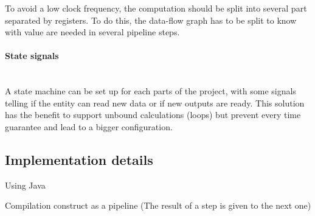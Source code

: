 \documentclass[10pt,a4paper]{article}
\begin{document}
To avoid a low clock frequency, the computation should be split into several part separated by registers. To do this, the data-flow graph has to be split to know with value are needed in several pipeline steps.


\paragraph{State signals}
~\\
A state machine can be set up for each parts of the project, with some signals telling if the entity can read new data or if new outputs are ready. This solution has the benefit to support unbound calculations (loops) but prevent every time guarantee and lead to a bigger configuration.



\subsection{Implementation details}

Using Java

Compilation construct as a pipeline (The result of a step is given to the next one)
 
 
 
 
 
 
\end{document}
